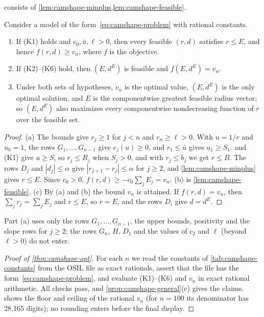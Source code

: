  consists of \cref{lem:camshape-minplus,lem:camshape-feasible}.

\begin{proposition}\label{prop:camshape-general}
Consider a model of the form~\eqref{eq:camshape-problem} with rational constants.
\begin{enumerate}
\item[(a)] If (K1) holds and $c_0, \bar u, \ell > 0$, then every feasible $(r,d)$ satisfies $r \le E$, and hence $f(r,d) \ge v_n$, where $f$ is the objective.
\item[(b)] If (K2)--(K6) hold, then $(E, d^E)$ is feasible and $f(E, d^E) = v_n$.
\item[(c)] Under both sets of hypotheses, $v_n$ is the optimal value, $(E, d^E)$ is the only optimal solution, and $E$ is the componentwise greatest feasible radius vector; so $(E, d^E)$ also maximizes every componentwise nondecreasing function of $r$ over the feasible set.
\end{enumerate}
\end{proposition}

\begin{proof}
(a) The bounds give $r_j \ge 1$ for $j < n$ and $r_n \ge \ell > 0$.
With $u = 1/r$ and $u_0 = 1$, the rows $G_1,\dots,G_{n-1}$ give $e_j(u) \ge 0$, and $r_1 \le \bar u$ gives $u_1 \ge S_1$.
 and (K1) give $u \ge S$, so $r_j \le R_j$ when $S_j > 0$, and with $r_j \le b_j$ we get $r \le B$.
The rows $D_j$ and $|d_j| \le \alpha$ give $|r_{j+1} - r_j| \le \alpha$ for $j \ge 2$, and \cref{lem:camshape-minplus} gives $r \le E$.
Since $c_0 > 0$, $f(r,d) \ge -c_0\sum_j E_j = v_n$.
(b) is \cref{lem:camshape-feasible}.
(c) By (a) and (b) the bound $v_n$ is attained.
If $f(r,d) = v_n$, then $\sum_j r_j = \sum_j E_j$ and $r \le E$, so $r = E$, and the rows $D_i$ give $d = d^E$.
\end{proof}

Part (a) uses only the rows $G_1,\dots,G_{n-1}$, the upper bounds, positivity and the slope rows for $j \ge 2$; the rows $G_n$, $H$, $D_1$ and the values of $c_2$ and $\ell$ (beyond $\ell > 0$) do not enter.

\begin{proof}[Proof of \cref{thm:camshape-opt}]
For each $n$ we read the constants of \cref{tab:camshape-constants} from the OSIL file as exact rationals, assert that the file has the form~\eqref{eq:camshape-problem}, and evaluate (K1)--(K6) and $v_n$ in exact rational arithmetic.
All checks pass, and \cref{prop:camshape-general}(c) gives the claims.
 shows the floor and ceiling of the rational $v_n$ (for $n = 100$ its denominator has 28,165 digits); no rounding enters before the final display.
\end{proof}

